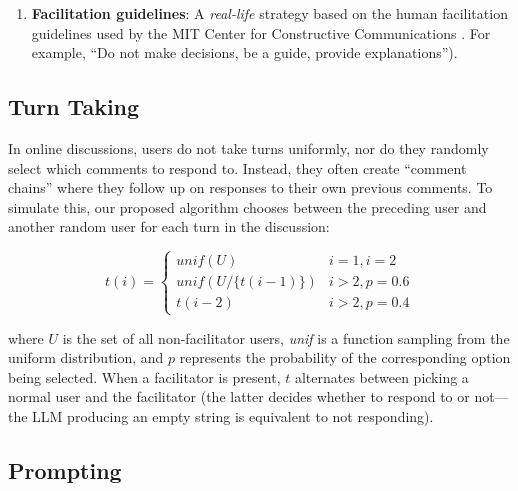 \begin{enumerate}
    \item \textbf{Facilitation guidelines}: A \emph{real-life} strategy based on the human facilitation guidelines used by the MIT Center for Constructive Communications \cite{dimitra-book}. For example, “Do not make decisions, be a guide, provide explanations”). %
\end{enumerate}


\subsection{Turn Taking}
\label{ssec:experimental:turn}

In online discussions, users do not take turns uniformly, nor do they randomly select which comments to respond to. Instead, they often create ``comment chains'' where they follow up on responses to their own previous comments. To simulate this, our proposed algorithm chooses between the preceding user and another random user for each turn in the discussion:

\small
\begin{equation}
\label{eq:turn_taking}
    t(i) = \left\{
\begin{array}{ll}
    \textit{unif}(U) & i=1, i=2\\
    \textit{unif}(U/\{t(i-1)\}) & i > 2, p=0.6 \\
    t(i-2) & i > 2, p=0.4 
\end{array} 
\right.
\end{equation}
\normalsize

\noindent where $U$ is the set of all non-facilitator users, \textit{unif} is a function sampling from the uniform distribution, and $p$ represents the probability of the corresponding option being selected. When a facilitator is present, $t$ alternates between picking a normal user and the facilitator (the latter decides whether to respond to or not---the \ac{LLM} producing an empty string is equivalent to not responding).


\subsection{Prompting}
\label{ssec:experimental:prompts}

